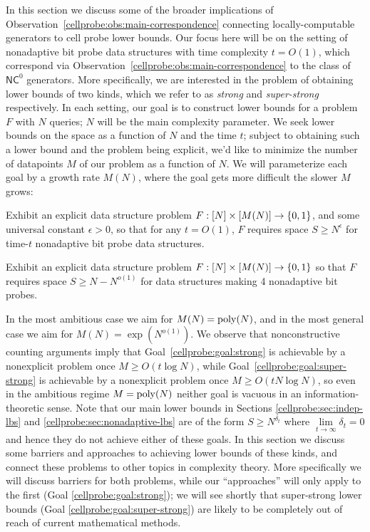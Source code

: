 In this section we discuss some of the broader implications of Observation~\ref{cellprobe:obs:main-correspondence} connecting locally-computable generators to cell probe lower bounds. Our focus here will be on the setting of nonadaptive bit probe data structures with time complexity $t = O(1)$, which correspond via Observation~\ref{cellprobe:obs:main-correspondence} to the class of $\mathsf{NC}^0$ generators. More specifically, we are interested in the problem of obtaining lower bounds of two kinds, which we refer to as \emph{strong} and \emph{super-strong} respectively. In each setting, our goal is to construct lower bounds for a problem $F$ with $N$ queries; $N$ will be the main complexity parameter. We seek lower bounds on the space as a function of $N$ and the time $t$; subject to obtaining such a lower bound and the problem being explicit, we'd like to minimize the number of datapoints $M$ of our problem as a function of $N$. We will parameterize each goal by a growth rate $M(N)$, where the goal gets more difficult the slower $M$ grows:

\begin{goal}\label{cellprobe:goal:strong}
Exhibit an explicit data structure problem $F: [N] \times [M(N)] \to \{0,1\}$, and some universal constant $\epsilon > 0$, so that for any $t =O(1)$, $F$ requires space $S \geq N^\epsilon$ for time-$t$ nonadaptive bit probe data structures.
\end{goal}
\begin{goal}\label{cellprobe:goal:super-strong}
Exhibit an explicit data structure problem $F: [N] \times [M(N)] \to \{0,1\}$ so that $F$ requires space $S \geq N- N^{o(1)}$ for data structures making 4 nonadaptive bit probes. 
\end{goal}
In the most ambitious case we aim for $M(N)= \mathrm{poly}(N)$, and in the most general case we aim for $M(N) = \exp(N^{o(1)})$. We observe that nonconstructive counting arguments imply that Goal~\ref{cellprobe:goal:strong} is achievable by a nonexplicit problem once $M \geq O(t\log N)$, while Goal~\ref{cellprobe:goal:super-strong} is achievable by a nonexplicit problem once $M \geq O(tN\log N)$, so even in the ambitious regime $M = \mathrm{poly}(N)$ neither goal is vacuous in an information-theoretic sense.
Note that our main lower bounds in Sections \ref{cellprobe:sec:indep-lbs} and \ref{cellprobe:sec:nonadaptive-lbs} are of the form $S \geq N^{\delta_t}$ where $\lim\limits_{t \to \infty} \delta_t = 0$ and hence they do not achieve either of these goals. In this section we discuss some barriers and approaches to achieving lower bounds of these kinds, and connect these problems to other topics in complexity theory. More specifically we will discuss barriers for both problems, while our ``approaches'' will only apply to the first (Goal \ref{cellprobe:goal:strong}); we will see shortly that super-strong lower bounds (Goal \ref{cellprobe:goal:super-strong}) are likely to be completely out of reach of current mathematical methods.

